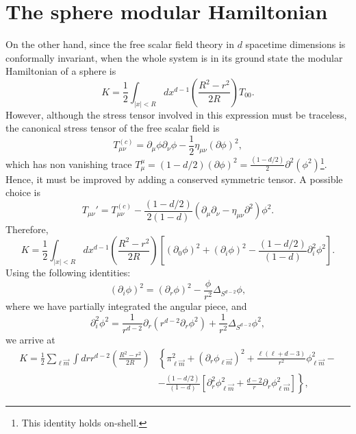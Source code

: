 \documentclass[12pt,a4paper]{article}
\begin{document}
\section{The sphere modular Hamiltonian}\label{sec: mH}
On the other hand, since the free scalar field theory in $d$ spacetime dimensions is conformally invariant, when the whole system is in its ground state the modular Hamiltonian of a sphere is
\begin{equation}\label{KCFT}
K=\frac{1}{2}\int_{\vert x\vert<R} dx^{d-1} \left(\frac{R^2-r^2}{2 R}\right)T_{00}.
\end{equation}
However, although the stress tensor involved in this expression must be traceless, the canonical stress tensor of the free scalar field is
\begin{equation}
T_{\mu\nu}^{(c)}=\partial_{\mu}\phi\partial_{\nu}\phi-\frac{1}{2}\eta_{\mu\nu}(\partial\phi)^2,
\end{equation}
which has non vanishing trace $T_{\mu}^{\mu}=\left(1-d/2\right)(\partial\phi)^2=\frac{(1-d/2)}{2}\partial^2(\phi^2)$\footnote{This identity holds on-shell.}. Hence, it must be improved by adding a conserved symmetric tensor. A possible choice is
\begin{equation}
T_{\mu\nu}'=T_{\mu\nu}^{(c)}-\frac{(1-d/2)}{2(1-d)}(\partial_{\mu}\partial_{\nu}-\eta_{\mu\nu}\partial^2)\phi^2.
\end{equation}
Therefore,
\begin{equation}
K=\frac{1}{2}\int_{\vert x\vert<R} dx^{d-1} \left(\frac{R^2-r^2}{2 R}\right)\left[(\partial_0 \phi)^2+(\partial_i \phi)^2-\frac{(1-d/2)}{(1-d)} \partial_i ^2 \phi^2\right].
\label{Kd}
\end{equation}
Using the following identities:
\begin{equation}
(\partial_i \phi)^2=(\partial_r \phi)^2- \frac{\phi}{r^2}\Delta_{S^{d-2}}\phi,
\end{equation}
where we have partially integrated the angular piece, and
\begin{equation}
\partial_i^2 \phi^2 =\frac{1}{r^{d-2}}\partial_r \left(r^{d-2} \partial_r \phi^2\right)+\frac{1}{r^2}\Delta_{S^{d-2}}\phi^2,
\end{equation}
we arrive at
\begin{equation}
\begin{split}
K=\frac{1}{2}\sum_{\ell \vec{m}}\int dr r^{d-2} \left(\frac{R^2-r^2}{2 R}\right)&\left\{ \pi_{\ell \vec{m}}^2+ ( \partial_r \phi_{\ell \vec{m}})^2+\frac{\ell(\ell+d-3)}{r^2} \phi_{\ell \vec{m}} ^2- \right.\\
& \left. - \frac{(1-d/2)}{(1-d)} \left[\partial_r ^2  \phi_{\ell \vec{m}}^2+\frac{d-2}{r}\partial_r \phi_{\ell \vec{m}} ^2\right]\right\},
\end{split}
\end{equation}
\end{document}
